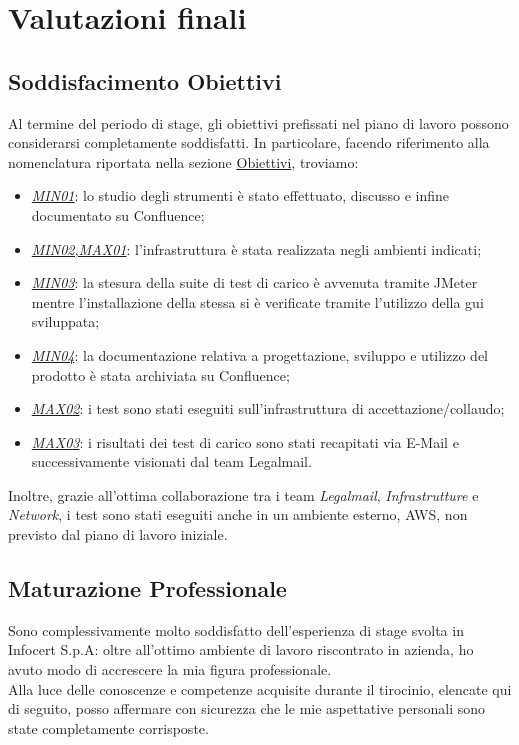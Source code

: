 
\chapter{Valutazioni finali}
\label{cap:valutazioni-finali}
\section{Soddisfacimento Obiettivi}
Al termine del periodo di stage, gli obiettivi prefissati nel piano di lavoro possono considerarsi completamente soddisfatti.
In particolare, facendo riferimento alla nomenclatura riportata nella sezione \hyperref[subsec:obiettivi]{Obiettivi}, troviamo:
\begin{itemize}
	\item \underline{\textit{MIN01}}: lo studio degli strumenti è stato effettuato, discusso e infine documentato su Confluence;
	\item \underline{\textit{MIN02,MAX01}}: l'infrastruttura è stata realizzata negli ambienti indicati;
	\item \underline{\textit{MIN03}}: la stesura della suite di test di carico è avvenuta tramite JMeter mentre l'installazione della stessa si è verificate tramite l'utilizzo della \gls{gui} sviluppata;
	\item \underline{\textit{MIN04}}: la documentazione relativa a progettazione, sviluppo e utilizzo del prodotto è stata archiviata su Confluence;
	\item \underline{\textit{MAX02}}: i test sono stati eseguiti sull'infrastruttura di accettazione/collaudo;
	\item \underline{\textit{MAX03}}: i risultati dei test di carico sono stati recapitati via E-Mail e successivamente visionati dal team Legalmail.
\end{itemize}
Inoltre, grazie all'ottima collaborazione tra i team \textit{Legalmail}, \textit{Infrastrutture} e \textit{Network}, i test sono stati eseguiti anche in un ambiente esterno, AWS, non previsto dal piano di lavoro iniziale.
\section{Maturazione Professionale}
Sono complessivamente molto soddisfatto dell'esperienza di stage svolta in Infocert S.p.A: oltre all'ottimo ambiente di lavoro riscontrato in azienda, ho avuto modo di accrescere la mia figura professionale. \\
Alla luce delle conoscenze e competenze acquisite durante il tirocinio, elencate qui di seguito, posso affermare con sicurezza che le mie aspettative personali sono state completamente corrisposte. 
